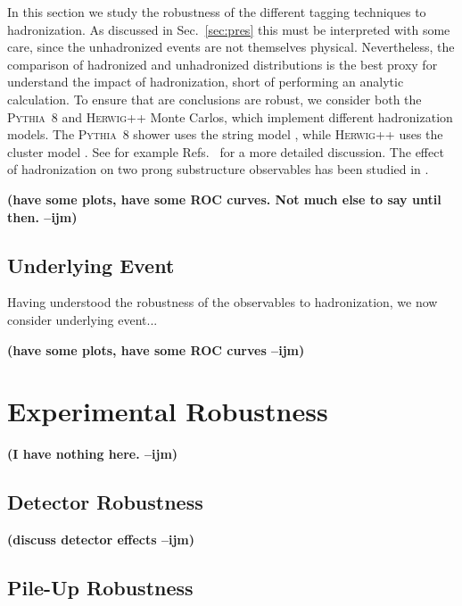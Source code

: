 \documentclass[11pt,letterpaper]{article}
\newcommand{\pythia}{\textsc{Pythia~8}\xspace}
\newcommand{\herwig}{\textsc{Herwig++}\xspace}
\DeclareRobustCommand{\Sec}[1]{Sec.~\ref{#1}}
\DeclareRobustCommand{\Refs}[1]{Refs.~\cite{#1}}
\newcommand{\ijm}[1]{\textbf{\textcolor{llblue}{(#1 --ijm)}}}
\begin{document}
In this section we study the robustness of the different tagging techniques to hadronization. As discussed in \Sec{sec:pres} this must be interpreted with some care, since the unhadronized events are not themselves physical. Nevertheless, the comparison of hadronized and unhadronized distributions is the best proxy for understand the impact of hadronization, short of performing an analytic calculation. To ensure that are conclusions are robust, we consider both the \pythia and \herwig Monte Carlos, which implement different hadronization models. The \pythia shower uses the string model \cite{Andersson:1983ia,Andersson:1998tv}, while \herwig uses the cluster model \cite{Webber:1983if,Marchesini:1987cf}. See for example \Refs{Buckley:2011ms,Skands:2011pf,Skands:2012ts} for a more detailed discussion. The effect of hadronization on two prong substructure observables has been studied in \cite{Larkoski:2015kga,Salam:2016yht}.


\ijm{have some plots, have some ROC curves. Not much else to say until then.}

\subsection{Underlying Event}\label{sec:UE}

Having understood the robustness of the observables to hadronization, we now consider underlying event...

\ijm{have some plots, have some ROC curves}

\section{Experimental Robustness}\label{sec:exp}


\ijm{I have nothing here.}

\subsection{Detector Robustness}\label{sec:detector_robust}

\ijm{discuss detector effects}

\subsection{Pile-Up Robustness}\label{sec:pu_robust}
\end{document}
